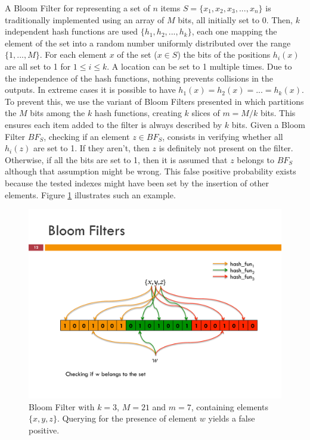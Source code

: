 A Bloom Filter for representing a set of $n$ items $S =
\{x_1,x_2,x_3,...,x_n\}$ is traditionally implemented using an array
of $M$ bits, all initially set to 0. Then, $k$ independent hash
functions are used $\{h_1,h_2,...,h_k \}$, each one mapping the
element of the set into a random number uniformly distributed over the
range $\{1,...,M\}$. For each element $x$ of the set ($x \in S $) the
bits of the positions $h_i (x)$ are all set to 1 for $1 \leq i \leq
k$. A location can be set to 1 multiple times. Due to the independence
of the hash functions, nothing prevents collisions in the outputs. In
extreme cases it is possible to have $h_1(x) = h_2(x) = ... = h_k(x)$.
To prevent this, we use the variant of Bloom Filters presented in
\cite{Chang04approximatecaches} which partitions the $M$ bits among
the $k$ hash functions, creating $k$ slices of $m = M/k$ bits. This
ensures each item added to the filter is always described by $k$ bits.
Given a Bloom Filter $BF_S$, checking if an element $z \in BF_S$,
consists in verifying whether all $h_i(z)$ are set to 1. If they
aren't, then $z$ is definitely not present on the filter. Otherwise,
if all the bits are set to 1, then it is assumed that $z$ belongs to
$BF_S$ although that assumption might be wrong. This false positive
probability exists because the tested indexes might have been set by
the insertion of other elements. Figure \ref{fig:bloom_filter}
illustrates such an example.
\begin{figure}[htb]
  \centering
  \includegraphics[width=\textwidth]{images/bloom_filter.pdf}
  \caption{ Bloom Filter with $k=3$, $M=21$ and $m=7$, containing
    elements $\{x,y,z\}$. Querying for the presence of element $w$
    yields a false positive.}
  \label{fig:bloom_filter}
\end{figure}

